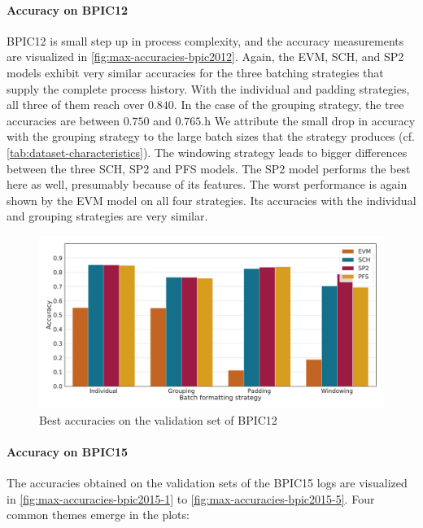 \paragraph{Accuracy on BPIC12}
BPIC12 is small step up in process complexity, and the accuracy measurements are visualized in \autoref{fig:max-accuracies-bpic2012}.
Again, the EVM, SCH, and SP2 models exhibit very similar accuracies for the three batching strategies that supply the complete process history.
With the individual and padding strategies, all three of them reach over $0.840$.
In the case of the grouping strategy, the tree accuracies are between $0.750$ and $0.765$.h
We attribute the small drop in accuracy with the grouping strategy to the large batch sizes that the strategy produces (cf. \autoref{tab:dataset-characteristics}).
The windowing strategy leads to bigger differences between the three SCH, SP2 and PFS models.
The SP2 model performs the best here as well, presumably because of its features.
The worst performance is again shown by the EVM model on all four strategies.
Its accuracies with the individual and grouping strategies are very similar.

\begin{figure}[!htb]
    \centering
    \includegraphics[width=\textwidth]{gfx/bpic2012/accuracies.pdf}
    \caption{Best accuracies on the validation set of BPIC12}
    \label{fig:max-accuracies-bpic2012}
\end{figure}

\paragraph{Accuracy on BPIC15}
The accuracies obtained on the validation sets of the BPIC15 logs are visualized in \autoref{fig:max-accuracies-bpic2015-1} to \autoref{fig:max-accuracies-bpic2015-5}.
Four common themes emerge in the plots:

